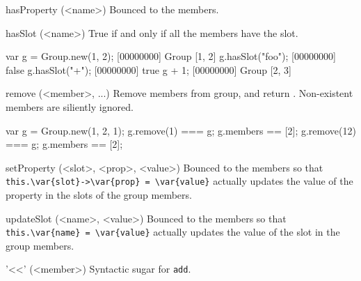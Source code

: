 \begin{urbiscriptapi}
\item[hasProperty](<name>)%
  Bounced to the members.

\item[hasSlot](<name>)%
  True if and only if all the members have the slot.

\begin{urbiscript}
var g = Group.new(1, 2);
[00000000] Group [1, 2]
g.hasSlot("foo");
[00000000] false
g.hasSlot("+");
[00000000] true
g + 1;
[00000000] Group [2, 3]
\end{urbiscript}

\item[remove](<member>, ...)%
  Remove members from \this group, and return \this.  Non-existent members
  are siliently ignored.
\begin{urbiassert}
var g = Group.new(1, 2, 1);
g.remove(1) === g;   g.members == [2];
g.remove(12) === g;  g.members == [2];
\end{urbiassert}


\item[setProperty](<slot>, <prop>, <value>)%
  Bounced to the members so that
  \lstinline|this.\var{slot}->\var{prop} = \var{value}|
  actually updates the value of the property 
  in the slots  of the group members.

\item[updateSlot](<name>, <value>)%
  Bounced to the members so that
  \lstinline|this.\var{name} = \var{value}|
  actually updates the value of the slot  in
  the group members.

\item['<<'](<member>)%
  Syntactic sugar for \lstinline|add|.
\end{urbiscriptapi}

